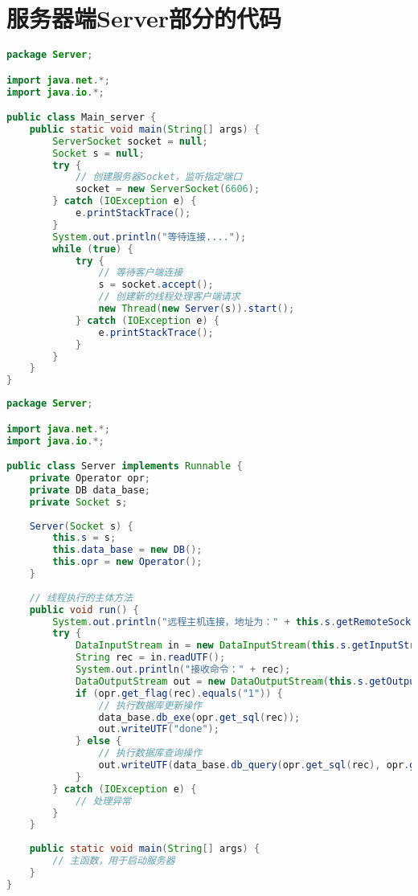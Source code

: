 \section{服务器端Server部分的代码}
\begin{lstlisting}[language = java, caption = Main\_Server.java]
package Server;

import java.net.*;
import java.io.*;

public class Main_server {
	public static void main(String[] args) {
		ServerSocket socket = null;
		Socket s = null;
		try {
			// 创建服务器Socket，监听指定端口
			socket = new ServerSocket(6606);
		} catch (IOException e) {
			e.printStackTrace();
		}
		System.out.println("等待连接....");
		while (true) {
			try {
				// 等待客户端连接
				s = socket.accept();
				// 创建新的线程处理客户端请求
				new Thread(new Server(s)).start();
			} catch (IOException e) {
				e.printStackTrace();
			}
		}
	}
}
\end{lstlisting}
\begin{lstlisting}[language = java, caption = Server.java]
package Server;

import java.net.*;
import java.io.*;

public class Server implements Runnable {
	private Operator opr;
	private DB data_base;
	private Socket s;
	
	Server(Socket s) {
		this.s = s;
		this.data_base = new DB();
		this.opr = new Operator();
	}
	
	// 线程执行的主体方法
	public void run() {
		System.out.println("远程主机连接，地址为：" + this.s.getRemoteSocketAddress());
		try {
			DataInputStream in = new DataInputStream(this.s.getInputStream());
			String rec = in.readUTF();
			System.out.println("接收命令：" + rec);
			DataOutputStream out = new DataOutputStream(this.s.getOutputStream());
			if (opr.get_flag(rec).equals("1")) {
				// 执行数据库更新操作
				data_base.db_exe(opr.get_sql(rec));
				out.writeUTF("done");
			} else {
				// 执行数据库查询操作
				out.writeUTF(data_base.db_query(opr.get_sql(rec), opr.get_col(rec), opr.get_f(rec)));
			}
		} catch (IOException e) {
			// 处理异常
		}
	}
	
	public static void main(String[] args) {
		// 主函数，用于启动服务器
	}
}
\end{lstlisting}
